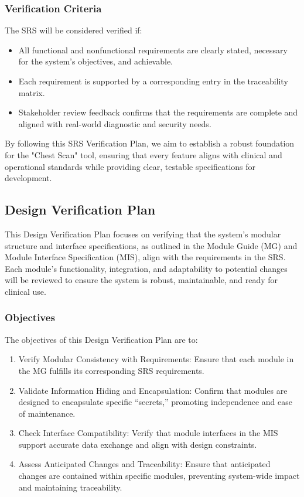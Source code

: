 \documentclass[12pt, titlepage]{article}
\begin{document}
\subsubsection{Verification Criteria}
The SRS will be considered verified if:
\begin{itemize}
  \item All functional and nonfunctional requirements are clearly stated, necessary for the system’s objectives, and achievable.
  \item Each requirement is supported by a corresponding entry in the traceability matrix.
  \item Stakeholder review feedback confirms that the requirements are complete and aligned with real-world diagnostic and security needs.
\end{itemize}
By following this SRS Verification Plan, we aim to establish a robust foundation for the "Chest Scan" tool, ensuring that every feature aligns with clinical and operational standards while providing clear, testable specifications for development.

\subsection{Design Verification Plan}
This Design Verification Plan focuses on verifying that the system’s modular structure and interface specifications, as outlined in the Module Guide (MG) and Module Interface Specification (MIS), align with the requirements in the SRS. Each module’s functionality, integration, and adaptability to potential changes will be reviewed to ensure the system is robust, maintainable, and ready for clinical use.

\subsubsection{Objectives}
The objectives of this Design Verification Plan are to:
\begin{enumerate}
  \item Verify Modular Consistency with Requirements: Ensure that each module in the MG fulfills its corresponding SRS requirements.
  \item Validate Information Hiding and Encapsulation: Confirm that modules are designed to encapsulate specific “secrets,” promoting independence and ease of maintenance.
  \item Check Interface Compatibility: Verify that module interfaces in the MIS support accurate data exchange and align with design constraints.
  \item Assess Anticipated Changes and Traceability: Ensure that anticipated changes are contained within specific modules, preventing system-wide impact and maintaining traceability.
\end{enumerate}
\end{document}
